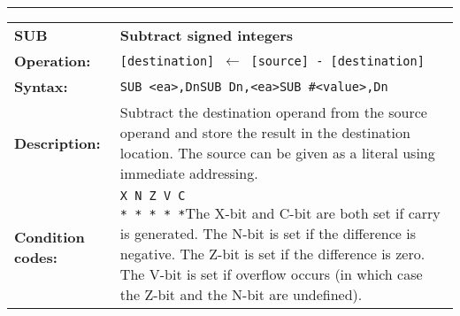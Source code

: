 \documentclass[]{article}
\begin{document}
\begin{appendices}
\noindent\rule{10cm}{1pt}\newline %
\setlength\extrarowheight{5pt} %
\begin{tabularx}{\textwidth}{lL}
  {\Large \textbf{SUB}} 	& {\Large \textbf{Subtract signed integers}}\\
  \textbf{Operation:} 		& \texttt{[destination] $\leftarrow$ [source] - [destination]}\\
  \textbf{Syntax:}  		& \texttt{SUB <ea>,Dn}\newline\texttt{SUB Dn,<ea>}\newline\texttt{SUB \#<value>,Dn}\\
  \textbf{Description:}  	& Subtract the destination operand from the source operand and store the
result in the destination location. The source can be given as a literal using immediate addressing.\\
  \textbf{Condition codes:} & \texttt{X N Z V C\newline * * * * *}\newline\newline The X-bit and C-bit are both set if carry is generated. The N-bit is set if the difference is negative. The Z-bit is set if the difference is zero. The V-bit is set if overflow occurs (in which case the Z-bit and the N-bit are undefined).\\
\end{tabularx}
\newline


\end{appendices}
\end{document}

